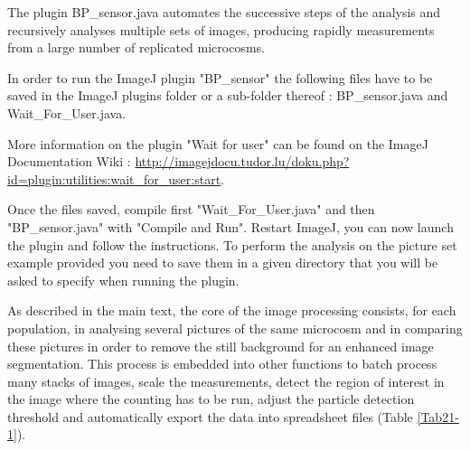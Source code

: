 The plugin BP\_sensor.java automates the successive steps of the analysis and
recursively analyses multiple sets of images, producing rapidly measurements
from a large number of replicated microcosms.

In order to run the ImageJ plugin "BP\_sensor" the following files have to be
saved in the ImageJ plugins folder or a sub-folder thereof : BP\_sensor.java and
Wait\_For\_User.java.

More information on the plugin "Wait for user" can be found on the ImageJ
Documentation Wiki :
\url{http://imagejdocu.tudor.lu/doku.php?id=plugin:utilities:wait_for_user:start}.

Once the files saved, compile first "Wait\_For\_User.java" and then
"BP\_sensor.java" with "Compile and Run". Restart ImageJ, you can now launch the
plugin and follow the instructions. To perform the analysis on the picture set
example provided you need to save them in a given directory that you will be
asked to specify when running the plugin.

As described in the main text, the core of the image processing consists, for
each population, in analysing several pictures of the same microcosm and in
comparing these pictures in order to remove the still background for an enhanced
image segmentation. This process is embedded into other functions to batch
process many stacks of images, scale the measurements, detect the region of
interest in the image where the counting has to be run, adjust the particle
detection threshold and automatically export the data into spreadsheet files
(Table \ref{Tab21-1}).

